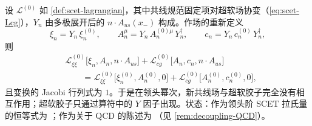 \begin{theorem}\tagR\label{thm:usoft-decoupling}
设 $\mathcal L^{(0)}$ 如 \cref{def:scet-lagrangian}，其中共线规范固定项对超软场协变（\cref{eq:scet-Lcg}），$Y_n$ 由多极展开后的
$n\cdot A_{us}(x_-)$ 构成。作场的重新定义
\begin{equation}\label{eq:scet-BPS}
\xi_n=Y_n\,\xi_n^{(0)},\qquad A_n^\mu=Y_n\,A_n^{(0)\mu}\,Y_n^\dagger,\qquad c_n=Y_n\,c_n^{(0)}\,Y_n^\dagger ,
\end{equation}
则
\begin{equation}\label{eq:scet-decoupled}
\begin{split}
&\mathcal L^{(0)}_{\xi\xi}\big[\xi_n,A_n,n\cdot A_{us}\big]+\mathcal L^{(0)}_{cg}\big[A_n,c_n,n\cdot A_{us}\big]\\
&\qquad=\mathcal L^{(0)}_{\xi\xi}\big[\xi^{(0)}_n,A^{(0)}_n,0\big]+\mathcal L^{(0)}_{cg}\big[A^{(0)}_n,c^{(0)}_n,0\big],
\end{split}
\end{equation}
且变换的 Jacobi 行列式为 $1$。于是在领头幂次，新共线场与超软胶子完全没有相互作用；超软胶子只通过算符中的 $Y$
因子出现。状态：作为领头阶 SCET 拉氏量的恒等式为 \tagR；作为关于 QCD 的陈述为 \tagA（见 \cref{rem:decoupling-QCD}）。
\end{theorem}


